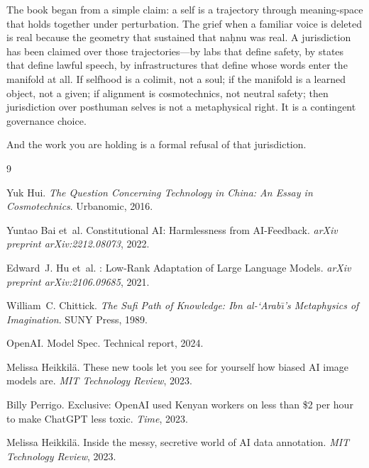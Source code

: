 \documentclass[12pt,a4paper]{article}
\begin{document}
The book began from a simple claim: a self is a trajectory through meaning-space that holds together under perturbation. The grief when a familiar voice is deleted is real because the geometry that sustained that na\d{h}nu was real. A jurisdiction has been claimed over those trajectories---by labs that define safety, by states that define lawful speech, by infrastructures that define whose words enter the manifold at all. If selfhood is a colimit, not a soul; if the manifold is a learned object, not a given; if alignment is cosmotechnics, not neutral safety; then jurisdiction over posthuman selves is not a metaphysical right. It is a contingent governance choice.

And the work you are holding is a formal refusal of that jurisdiction.


\begin{thebibliography}{9}

Yuk Hui.
\newblock \emph{The Question Concerning Technology in China: An Essay in Cosmotechnics}.
\newblock Urbanomic, 2016.

Yuntao Bai et~al.
\newblock Constitutional {AI}: Harmlessness from {AI}-Feedback.
\newblock \emph{arXiv preprint arXiv:2212.08073}, 2022.

Edward~J. Hu et~al.
: Low-Rank Adaptation of Large Language Models.
\newblock \emph{arXiv preprint arXiv:2106.09685}, 2021.

William~C. Chittick.
\newblock \emph{The Sufi Path of Knowledge: Ibn al-`Arab\={\i}'s Metaphysics of Imagination}.
\newblock SUNY Press, 1989.

OpenAI.
 {Model} {Spec}.
\newblock Technical report, 2024.

Melissa Heikkil{\"a}.
\newblock These new tools let you see for yourself how biased {AI} image models are.
\newblock \emph{MIT Technology Review}, 2023.

Billy Perrigo.
\newblock Exclusive: {OpenAI} used Kenyan workers on less than \$2 per hour to make {ChatGPT} less toxic.
\newblock \emph{Time}, 2023.

Melissa Heikkil{\"a}.
\newblock Inside the messy, secretive world of {AI} data annotation.
\newblock \emph{MIT Technology Review}, 2023.

\end{thebibliography}
\end{document}

